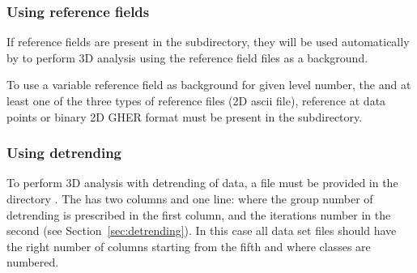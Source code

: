 \subsubsection{Using reference fields}
\label{divarefeuse}

If reference fields are present in the  subdirectory, they will be used automatically by \diva to perform  3D analysis using the reference field files as a background.

To use a variable reference field as background for given level number, the  and at least one of the three types of reference files  (2D ascii file), reference at data points or  binary 2D GHER format must be present in the  subdirectory.



\begin{center}
\end{center}



\subsubsection{Using detrending}


To perform \diva 3D analysis with detrending of data, a  file must be provided in the directory . The   has two columns and one line: where the group number of detrending is prescribed in the first column, and the iterations number in the second (see Section~\ref{sec:detrending}). In this case all data set files should have the right number of columns starting from the fifth and where classes are numbered.


\begin{center}
\end{center}



